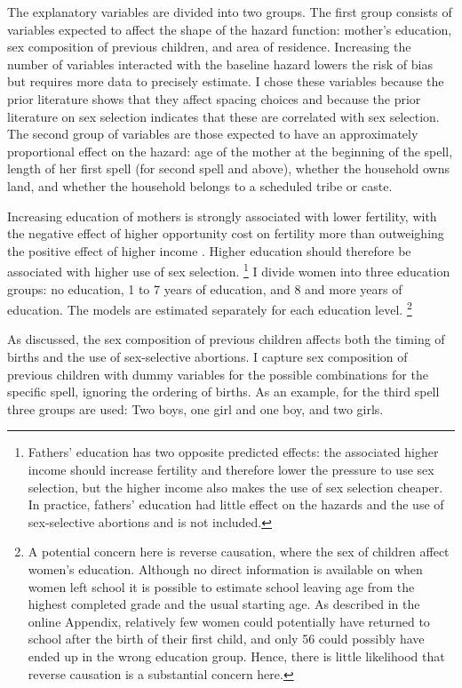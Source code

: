 \documentclass[12pt,letterpaper]{article}
\begin{document}
The explanatory variables are divided into two groups.
The first group consists of variables expected to affect the shape of the hazard function: 
mother's education, sex composition of previous children, and area of residence.
Increasing the number of variables interacted with the baseline hazard lowers the risk 
of bias but requires more data to precisely estimate.
I chose these variables because the prior literature shows that they affect 
spacing choices and because the prior literature on sex selection indicates 
that these are correlated with sex selection.
The second group of variables are those expected to have an approximately 
proportional effect on the hazard: age of the mother at the beginning of the spell, 
length of her first spell (for second spell and above), whether the household owns 
land, and whether the household belongs to a scheduled tribe or caste.

Increasing education of mothers is strongly associated with lower fertility, with
the negative effect of higher opportunity cost on fertility more than outweighing the 
positive effect of higher income \citep{schultz97}.
Higher education should therefore be associated with higher use of sex selection.%
\footnote{
Fathers' education has two opposite predicted effects: the associated higher income
should increase fertility and therefore lower the pressure to use sex selection, but
the higher income also makes the use of sex selection cheaper.
In practice, fathers' education had little effect on the hazards and the use of 
sex-selective abortions and is not included.
}
I divide women into three education groups:
no education, 1 to 7 years of education, and 8 and more years of education.
The models are estimated separately for each education level.%
\footnote{
A potential concern here is reverse causation, where the sex of children
affect women's education.
Although no direct information is available on when women left school it is
possible to estimate school leaving age from the highest completed grade
and the usual starting age.
As described in the online Appendix, relatively few women could potentially 
have returned to school after the birth of their first child,
and only 56 could possibly have ended up in the wrong education group. 
Hence, there is little likelihood that reverse causation is a substantial
concern here.
}

As discussed, the sex composition of previous children affects both the timing
of births and the use of sex-selective abortions.
I capture sex composition of previous children with dummy variables for the
possible combinations for the specific spell, ignoring the ordering of births.
As an example, for the third spell three groups are used: Two boys,
one girl and one boy, and two girls.
\end{document}
